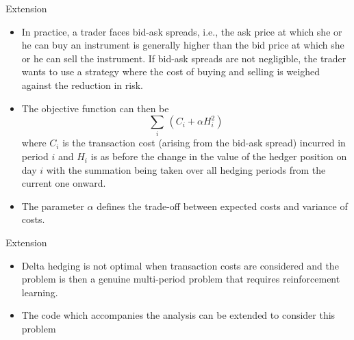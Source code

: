 \documentclass[11pt]{beamer}
\begin{document}
\begin{frame}{Extension}
	\begin{itemize}
		\item In practice, a trader faces bid-ask spreads, i.e., the ask price at which she or he can buy an instrument is generally higher than the bid price at which she or he can sell the instrument. If bid-ask spreads are not negligible, the trader wants to use a strategy where the cost of buying and selling is weighed against the reduction in risk. 
		\item The objective function can then be $$\sum\limits_i \, \left( C_i + \alpha H_i^2 \right)$$ where $C_i$ is the transaction cost (arising from the bid-ask spread) incurred in period $i$ and $H_i$ is as before the change in the value of the hedger position on day $i$ with the summation being taken over all hedging periods from the current one onward. 
		\item The parameter $\alpha$ defines the trade-off between expected costs and variance of costs.
	\end{itemize}
\end{frame}
\begin{frame}{Extension}
	\begin{itemize}
		\item Delta hedging is not optimal when transaction costs are considered and the problem is then a genuine multi-period problem that requires reinforcement learning.
		\item The code which accompanies the analysis can be extended to consider this problem
	\end{itemize}
\end{frame}
\end{document}
